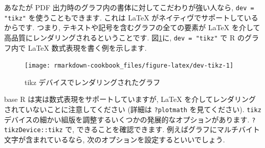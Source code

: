 \documentclass[
  11pt,
  lualatex,
  ja=standard]{bxjsreport}
\newenvironment{Shaded}{\begin{snugshade}}{\end{snugshade}}
\newcommand{\AttributeTok}[1]{\textcolor[rgb]{0.77,0.63,0.00}{#1}}
\newcommand{\DecValTok}[1]{\textcolor[rgb]{0.00,0.00,0.81}{#1}}
\newcommand{\FunctionTok}[1]{\textcolor[rgb]{0.00,0.00,0.00}{#1}}
\newcommand{\NormalTok}[1]{#1}
\newcommand{\SpecialCharTok}[1]{\textcolor[rgb]{0.00,0.00,0.00}{#1}}
\newcommand{\StringTok}[1]{\textcolor[rgb]{0.31,0.60,0.02}{#1}}
\begin{document}
あなたが PDF 出力時のグラフ内の書体に対してこだわりが強い人なら, \texttt{dev = "tikz"} を使うこともできます. これは LaTeX がネイティヴでサポートしているからです. つまり, テキストや記号を含むグラフの全ての要素が LaTeX を介して高品質にレンダリングされるということです. 図\ref{fig:dev-tikz}に, \texttt{dev = "tikz"} で R のグラフ内で LaTeX 数式表現を書く例を示します.

\begin{Shaded}
\end{Shaded}

\begin{figure}

{\centering \texttt{[image: rmarkdown-cookbook\_files/figure-latex/dev-tikz-1]} 

}

\caption{tikz デバイスでレンダリングされたグラフ}\label{fig:dev-tikz}
\end{figure}

base R は実は数式表現をサポートしていますが, LaTeX を介してレンダリングされていないことに注意してください (詳細は \texttt{?plotmath} を見てください). \texttt{tikz} デバイスの細かい組版を調整するいくつかの発展的なオプションがあります. \texttt{?tikzDevice::tikz} で, できることを確認できます. 例えばグラフにマルチバイト文字が含まれているなら, 次のオプションを設定するといいでしょう.
\end{document}
